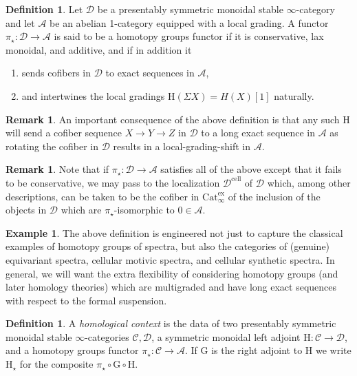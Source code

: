 \documentclass[10pt]{amsart}
\theoremstyle{definition}
\numberwithin{figure}{section}
\numberwithin{equation}{section}
\newtheorem{definition}[figure]{Definition}
\newtheorem{remark}[figure]{Remark}
\newtheorem{example}[figure]{Example}
\newcommand{\cA}{\mathcal{A}}
\newcommand{\cC}{\mathcal{C}}
\newcommand{\cD}{\mathcal{D}}
\theoremstyle{cited}
\newcommand{\Cat}{\mathrm{Cat}_\infty}
\renewcommand{\H}{\mathrm{H}}
\newcommand{\G}{\mathrm{G}}
\begin{document}
\begin{definition}
  Let $\cD$ be a presentably symmetric monoidal stable $\infty$-category and let $\cA$ be an abelian 1-category equipped with a local grading. A functor $\pi_\star:\cD\to \cA$ is said to be a homotopy groups functor if it is conservative, lax monoidal, and additive, and if in addition it
  \begin{enumerate}
    \item sends cofibers in $\cD$ to exact sequences in $\cA$,
    \item and intertwines the local gradings $\H(\Sigma X)=H(X)[1]$ naturally.
  \end{enumerate}
\end{definition}


\begin{remark}
  An important consequence of the above definition is that any such $\H$ will send a cofiber sequence $X\to Y\to Z$ in $\cD$ to a long exact sequence in $\cA$ as rotating the cofiber in $\cD$ results in a local-grading-shift in $\cA$.
\end{remark}

\begin{remark}
Note that if $\pi_\star:\cD\to \cA$ satisfies all of the above except that it fails to be conservative, we may pass to the localization $\cD^{\mathrm{cell}}$ of $\cD$ which, among other descriptions, can be taken to be the cofiber in $\Cat^\mathrm{ex}$ of the inclusion of the objects in $\cD$ which are $\pi_\star$-isomorphic to $0\in \cA$.
\end{remark}

\begin{example}
  The above definition is engineered not just to capture the classical examples of homotopy groups of spectra, but also the categories of (genuine) equivariant spectra, cellular motivic spectra, and cellular synthetic spectra. In general, we will want the extra flexibility of considering homotopy groups (and later homology theories) which are multigraded and have long exact sequences with respect to the formal suspension.
\end{example}

\begin{definition}
  \label{def:homcontext}
  A \textit{homological context} is the data of two presentably symmetric monoidal stable $\infty$-categories $\cC,\cD$, a symmetric monoidal left adjoint $\H:\cC\to \cD$, and a homotopy groups functor $\pi_\star:\cC\to \cA$. If $\G$ is the right adjoint to $\H$ we write $\H_\star$ for the composite $\pi_\star\circ \G\circ \H$.
\end{definition}
\end{document}
